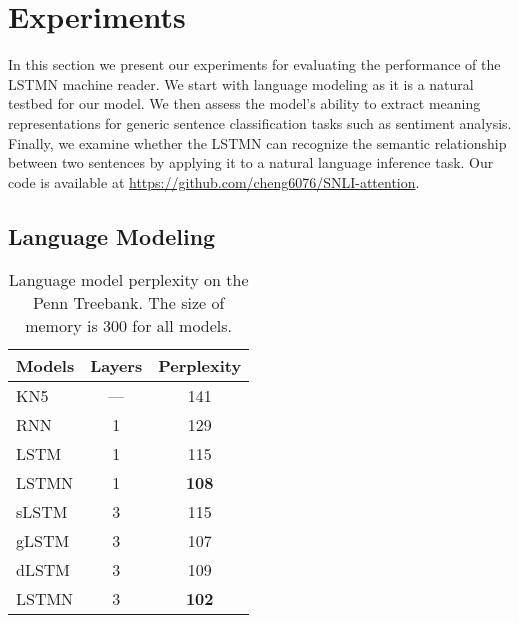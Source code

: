 \documentclass[11pt,letterpaper]{article}
\begin{document}
	\section{Experiments}
	\label{sec:experiments}
	
	In this section we present our experiments for evaluating the
        performance of the LSTMN machine reader. We start with
        language modeling as it is a natural testbed for our model. We
        then assess the model's ability to extract meaning
        representations for generic sentence classification tasks such
        as sentiment analysis. Finally, we examine whether the LSTMN
        can recognize the semantic relationship between two sentences
        by applying it to a natural language inference task. Our code
        is available at
        \url{https://github.com/cheng6076/SNLI-attention}.
	
	\subsection{Language Modeling}
	\label{sec:language-modeling}
	


	\begin{table}[t]
		\centering
	    \small
		\begin{tabular}{|l|c|c|}
			\hline
			Models & Layers & Perplexity \\
			\hline\hline
			KN5 & --- & 141 \\\hline
			RNN & 1 & 129 \\
			LSTM & 1 & 115 \\
			LSTMN & 1 &  \textbf{108} \\
			\hline
			sLSTM & 3 &  115 \\ 
			gLSTM & 3 & 107 \\
			dLSTM & 3 & 109 \\
			LSTMN & 3 &  \textbf{102} \\
			\hline
		\end{tabular}
		\caption{Language model perplexity on 
                  the Penn Treebank. The size of memory is 300 for all
                  models.} 
		\label{lmr}
		\vspace{-2.5ex}
	\end{table}
	
\end{document}
